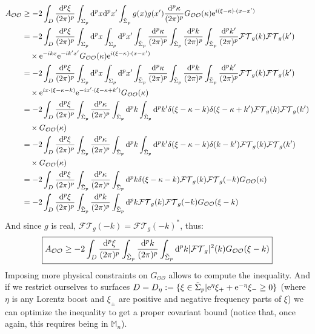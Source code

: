 \documentclass[a4paper,11pt]{article}
\numberwithin{equation}{section}
\theoremstyle{definition}
\renewcommand{\d}{{\mathrm{d}}}
\newcommand{\e}{{\mathrm{e}}}
\begin{document}
\begin{align}
     A_{\mathcal{O}\mathcal{O}} &\geq -2 \int_D \frac{\d^p\xi}{(2\pi)^p}\int_{\Sigma_p}\d^px\d^px' \int_{\Tilde{\Sigma}_p}g(x)g(x')\frac{\d^p\kappa}{(2\pi)^p}G_{\mathcal{O}\mathcal{O}}(\kappa)\e^{i(\xi-\kappa)\cdot(x-x')}\notag\\
     &=-2 \int_D \frac{\d^p\xi}{(2\pi)^p}\int_{\Sigma_p}\d^px\int_{\Sigma_p}\d^px' \int_{\Tilde{\Sigma}_p}\frac{\d^p\kappa}{(2\pi)^p}\int_{\Tilde{\Sigma}_p}\frac{\d^pk}{(2\pi)^p}\int_{\Tilde{\Sigma}_p}\frac{\d^pk'}{(2\pi)^p}\mathcal{FT}_g(k)\mathcal{FT}_g(k')\notag\\&\quad \times \e^{-ikx}\e^{-ik'x'} G_{\mathcal{O}\mathcal{O}}(\kappa)\e^{i(\xi-\kappa)\cdot(x-x')}\notag\\
     &=-2 \int_D \frac{\d^p\xi}{(2\pi)^p}\int_{\Sigma_p}\d^px\int_{\Sigma_p}\d^px' \int_{\Tilde{\Sigma}_p}\frac{\d^p\kappa}{(2\pi)^p}\int_{\Tilde{\Sigma}_p}\frac{\d^pk}{(2\pi)^p}\int_{\Tilde{\Sigma}_p}\frac{\d^pk'}{(2\pi)^p}\mathcal{FT}_g(k)\mathcal{FT}_g(k')\notag\\
     &\quad \times \e^{ix\cdot(\xi-\kappa-k)}\e^{-ix'\cdot(\xi-\kappa+k')} G_{\mathcal{O}\mathcal{O}}(\kappa)\notag\\
     &=-2 \int_D \frac{\d^p\xi}{(2\pi)^p} \int_{\Tilde{\Sigma}_p}\frac{\d^p\kappa}{(2\pi)^p}\int_{\Tilde{\Sigma}_p}\d^pk\int_{\Tilde{\Sigma}_p}\d^pk'\delta(\xi-\kappa-k)\delta(\xi-\kappa+k')\mathcal{FT}_g(k)\mathcal{FT}_g(k')\notag\\
     &\quad \times G_{\mathcal{O}\mathcal{O}}(\kappa)\notag\\
     &=-2 \int_D \frac{\d^p\xi}{(2\pi)^p} \int_{\Tilde{\Sigma}_p}\frac{\d^p\kappa}{(2\pi)^p}\int_{\Tilde{\Sigma}_p}\d^pk\int_{\Tilde{\Sigma}_p}\d^pk'\delta(\xi-\kappa-k)\delta(k-k')\mathcal{FT}_g(k)\mathcal{FT}_g(k')\notag\\&\quad \times G_{\mathcal{O}\mathcal{O}}(\kappa)\notag\\
     &=-2 \int_D \frac{\d^p\xi}{(2\pi)^p} \int_{\Tilde{\Sigma}_p}\frac{\d^p\kappa}{(2\pi)^p}\int_{\Tilde{\Sigma}_p}\d^pk\delta(\xi-\kappa-k)\mathcal{FT}_g(k)\mathcal{FT}_g(-k)G_{\mathcal{O}\mathcal{O}}(\kappa)\notag\\
     &=-2 \int_D \frac{\d^p\xi}{(2\pi)^p} \int_{\Tilde{\Sigma}_p}\frac{\d^pk}{(2\pi)^p}\int_{\Tilde{\Sigma}_p}\d^pk\mathcal{FT}_g(k)\mathcal{FT}_g(-k)G_{\mathcal{O}\mathcal{O}}(\xi-k)
\end{align}
And since $g$ is real, $\mathcal{FT}_g(-k)=\mathcal{FT}_g(-k)^*$, thus:
\begin{equation}
    \boxed{A_{\mathcal{O}\mathcal{O}} \geq -2 \int_D \frac{\d^p\xi}{(2\pi)^p} \int_{\Tilde{\Sigma}_p}\frac{\d^pk}{(2\pi)^p}\int_{\Tilde{\Sigma}_p}\d^pk |\mathcal{FT}_g|^2(k)G_{\mathcal{O}\mathcal{O}}(\xi-k)}
\end{equation}
Imposing more physical constraints on $G_{\mathcal{O}\mathcal{O}}$ allows to compute the inequality. And if we restrict ourselves to surfaces $D=D_\eta:=\{\xi\in\Tilde{\Sigma}_p | \e^\eta\xi_++\e^{-\eta}\xi_-\geq0\}$ (where $\eta$ is any Lorentz boost and $\xi_\pm$ are positive and negative frequency parts of $\xi$) we can optimize the inequality to get a proper covariant bound (notice that, once again, this requires being in $\mathbb{M}_n$).
\end{document}
